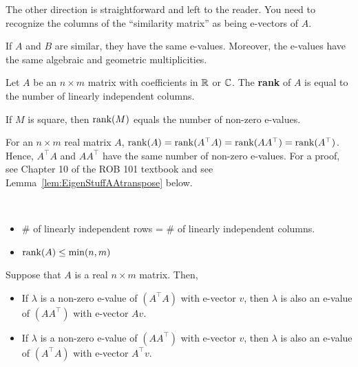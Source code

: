         The other direction is straightforward and left to the reader. You need to recognize the columns of the ``similarity matrix'' as being e-vectors of $A$.
\Qed

\begin{fact}
If $A$ and $B$ are similar, they have the same e-values. Moreover, the e-values have the same algebraic and geometric multiplicities. 
\end{fact} 



\begin{definition}
 Let $A$ be an $n \times m$ matrix with coefficients in $\mathbb R$ or  $\mathbb C$. The \textbf{rank} of $A$ is equal to the number of linearly independent columns. 
\end{definition}

\begin{fact}
If $M$ is square, then $\mathrm{rank}(M)$ equals the number of non-zero e-values.
\end{fact}

\begin{fact}
\label{fact:rankAAtranspose}
For an $n \times m$ real matrix $A$, $\mathrm{rank}(A) = \mathrm{rank}(A^\top A) = \mathrm{rank}(AA^\top) = \mathrm{rank}(A^\top)$. Hence, $A^\top A$ and $AA^\top$ have the same number of non-zero e-values. For a proof, see Chapter 10 of the ROB 101 textbook and see Lemma~\ref{lem:EigenStuffAAtranspose} below.
\end{fact} 




\begin{cor}\mbox{ }
\begin{itemize}
    \item $\#$ of linearly independent rows  = $\#$ of linearly independent columns.
    \item $\mathrm{rank}(A) \le \min(n, m)$
\end{itemize}
\end{cor}

\begin{lem}
\label{lem:EigenStuffAAtranspose}
Suppose that $A$ is a real $n \times m$ matrix. Then, 
\begin{itemize}
    \item If $\lambda$ is a non-zero e-value of $\left(A^\top A \right)$ with e-vector $v$, then $\lambda$ is also an e-value of $\left(A A^\top \right)$ with e-vector $A v$.
    \item If $\lambda$ is a non-zero e-value of $\left(A A^\top \right)$ with e-vector $v$, then $\lambda$ is also an e-value of $\left( A^\top A \right)$ with e-vector $A^\top  v$.
\end{itemize}
\end{lem}

